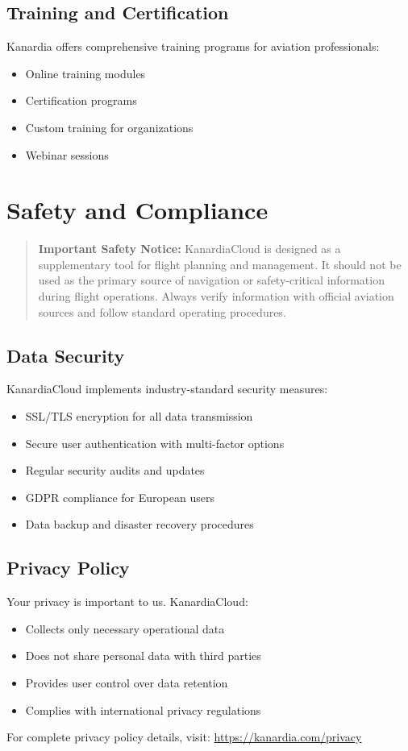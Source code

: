\subsection{Training and Certification}
Kanardia offers comprehensive training programs for aviation professionals:
\begin{itemize}
    \item Online training modules
    \item Certification programs
    \item Custom training for organizations
    \item Webinar sessions
\end{itemize}

\section{Safety and Compliance}

\begin{quote}
\textbf{Important Safety Notice:} KanardiaCloud is designed as a supplementary tool for flight planning and management. It should not be used as the primary source of navigation or safety-critical information during flight operations. Always verify information with official aviation sources and follow standard operating procedures.
\end{quote}

\subsection{Data Security}
KanardiaCloud implements industry-standard security measures:
\begin{itemize}
    \item SSL/TLS encryption for all data transmission
    \item Secure user authentication with multi-factor options
    \item Regular security audits and updates
    \item GDPR compliance for European users
    \item Data backup and disaster recovery procedures
\end{itemize}

\subsection{Privacy Policy}
Your privacy is important to us. KanardiaCloud:
\begin{itemize}
    \item Collects only necessary operational data
    \item Does not share personal data with third parties
    \item Provides user control over data retention
    \item Complies with international privacy regulations
\end{itemize}

For complete privacy policy details, visit: \url{https://kanardia.com/privacy}
